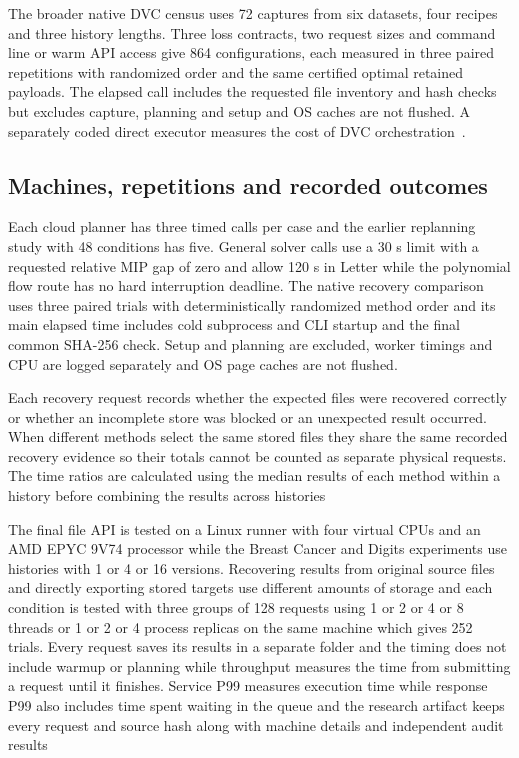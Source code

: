 The broader native DVC census uses 72 captures from six datasets, four recipes and three history lengths. Three loss contracts, two request sizes and command line or warm API access give 864 configurations, each measured in three paired repetitions with randomized order and the same certified optimal retained payloads. The elapsed call includes the requested file inventory and hash checks but excludes capture, planning and setup and OS caches are not flushed. A separately coded direct executor measures the cost of DVC orchestration~\cite{artifact}.

\subsection{Machines, repetitions and recorded outcomes}

Each cloud planner has three timed calls per case and the earlier replanning study with 48 conditions has five. General solver calls use a 30 s limit with a requested relative MIP gap of zero and allow 120 s in Letter while the polynomial flow route has no hard interruption deadline. The native recovery comparison uses three paired trials with deterministically randomized method order and its main elapsed time includes cold subprocess and CLI startup and the final common SHA-256 check. Setup and planning are excluded, worker timings and CPU are logged separately and OS page caches are not flushed.

Each recovery request records whether the expected files were recovered correctly or whether an incomplete store was blocked or an unexpected result occurred. When different methods select the same stored files they share the same recorded recovery evidence so their totals cannot be counted as separate physical requests. The time ratios are calculated using the median results of each method within a history before combining the results across histories

The final file API is tested on a Linux runner with four virtual CPUs and an AMD EPYC 9V74 processor while the Breast Cancer and Digits experiments use histories with 1 or 4 or 16 versions. Recovering results from original source files and directly exporting stored targets use different amounts of storage and each condition is tested with three groups of 128 requests using 1 or 2 or 4 or 8 threads or 1 or 2 or 4 process replicas on the same machine which gives 252 trials. Every request saves its results in a separate folder and the timing does not include warmup or planning while throughput measures the time from submitting a request until it finishes. Service P99 measures execution time while response P99 also includes time spent waiting in the queue and the research artifact keeps every request and source hash along with machine details and independent audit results

